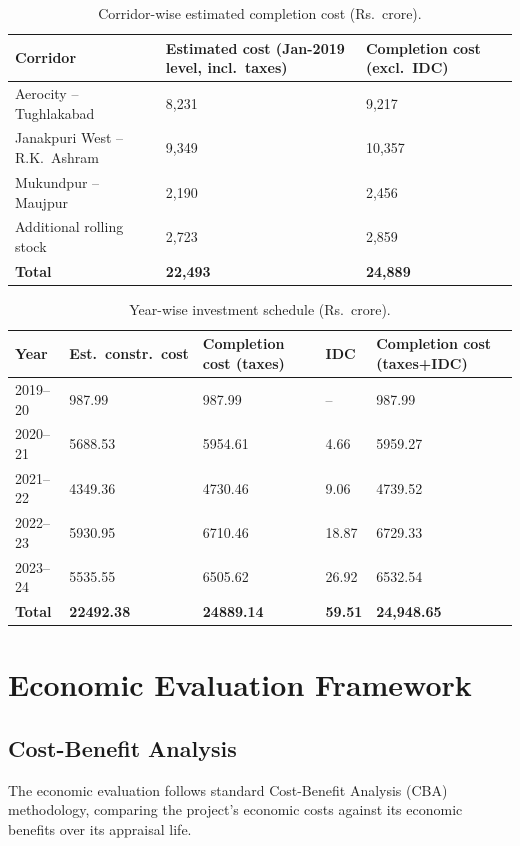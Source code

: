 \documentclass[11pt]{article}
\begin{document}
\begin{table}[H]
  \centering
  \caption{Corridor-wise estimated completion cost (Rs.\ crore).}
  \label{tab:cost}
  \small
  \begin{tabular}{@{}p{4.5cm}p{3.7cm}p{3.2cm}@{}}
    \toprule
    \textbf{Corridor} & \textbf{Estimated cost (Jan-2019 level, incl.\ taxes)} & \textbf{Completion cost (excl.\ IDC)} \\
    \midrule
    Aerocity -- Tughlakabad        & 8,231  & 9,217 \\
    Janakpuri West -- R.K.\ Ashram & 9,349  & 10,357 \\
    Mukundpur -- Maujpur           & 2,190  & 2,456 \\
    Additional rolling stock       & 2,723  & 2,859 \\
    \midrule
    \textbf{Total}                 & \textbf{22,493} & \textbf{24,889} \\
    \bottomrule
  \end{tabular}
\end{table}

\begin{table}[H]
  \centering
  \caption{Year-wise investment schedule (Rs.\ crore).}
  \small
  \begin{tabular}{@{}p{2.0cm}p{2.6cm}p{2.6cm}p{1.3cm}p{2.6cm}@{}}
    \toprule
    \textbf{Year} & \textbf{Est.\ constr.\ cost} & \textbf{Completion cost (taxes)} & \textbf{IDC} & \textbf{Completion cost (taxes+IDC)} \\
    \midrule
    2019--20 & 987.99  & 987.99  & --    & 987.99 \\
    2020--21 & 5688.53 & 5954.61 & 4.66  & 5959.27 \\
    2021--22 & 4349.36 & 4730.46 & 9.06  & 4739.52 \\
    2022--23 & 5930.95 & 6710.46 & 18.87 & 6729.33 \\
    2023--24 & 5535.55 & 6505.62 & 26.92 & 6532.54 \\
    \midrule
    \textbf{Total} & \textbf{22492.38} & \textbf{24889.14} & \textbf{59.51} & \textbf{24,948.65} \\
    \bottomrule
  \end{tabular}
\end{table}

\section{Economic Evaluation Framework}

\subsection{Cost-Benefit Analysis}
The economic evaluation follows standard Cost-Benefit Analysis (CBA) methodology, comparing the
project's economic costs against its economic benefits over its appraisal life.
\end{document}
